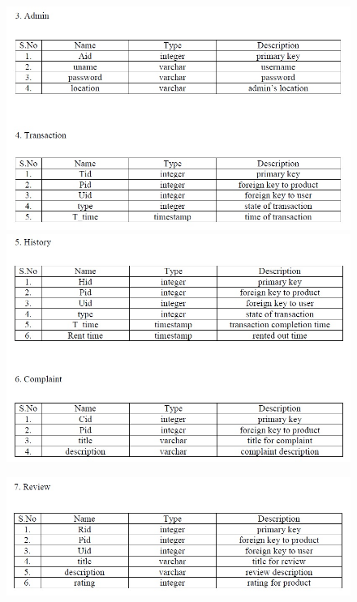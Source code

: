 \documentclass[11pt]{report}
\begin{document}
\begin{figure}[h]
  \centering
    \includegraphics[width=7in]{admin_transaction.jpg} 
  \centering
    \includegraphics[width=7in]{history_complaint.jpg} 
   \end{figure}
\begin{figure}[h]
  \centering
    \includegraphics[width=7in]{review.jpg} 
    \vspace{10in}
   \end{figure}
\end{document}
